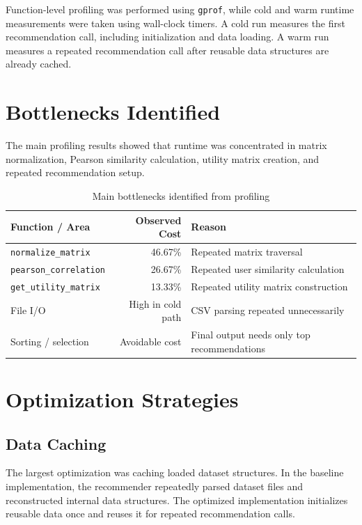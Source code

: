 \documentclass[11pt]{article}
\begin{document}
Function-level profiling was performed using \texttt{gprof}, while cold and warm runtime measurements were taken using wall-clock timers. A cold run measures the first recommendation call, including initialization and data loading. A warm run measures a repeated recommendation call after reusable data structures are already cached.

\section{Bottlenecks Identified}

The main profiling results showed that runtime was concentrated in matrix normalization, Pearson similarity calculation, utility matrix creation, and repeated recommendation setup.

\begin{table}[H]
\centering
\caption{Main bottlenecks identified from profiling}
\begin{tabular}{lrl}
\toprule
\textbf{Function / Area} & \textbf{Observed Cost} & \textbf{Reason} \\
\midrule
\texttt{normalize\_matrix} & 46.67\% & Repeated matrix traversal \\
\texttt{pearson\_correlation} & 26.67\% & Repeated user similarity calculation \\
\texttt{get\_utility\_matrix} & 13.33\% & Repeated utility matrix construction \\
File I/O & High in cold path & CSV parsing repeated unnecessarily \\
Sorting / selection & Avoidable cost & Final output needs only top recommendations \\
\bottomrule
\end{tabular}
\end{table}

\section{Optimization Strategies}

\subsection{Data Caching}

The largest optimization was caching loaded dataset structures. In the baseline implementation, the recommender repeatedly parsed dataset files and reconstructed internal data structures. The optimized implementation initializes reusable data once and reuses it for repeated recommendation calls.
\end{document}
